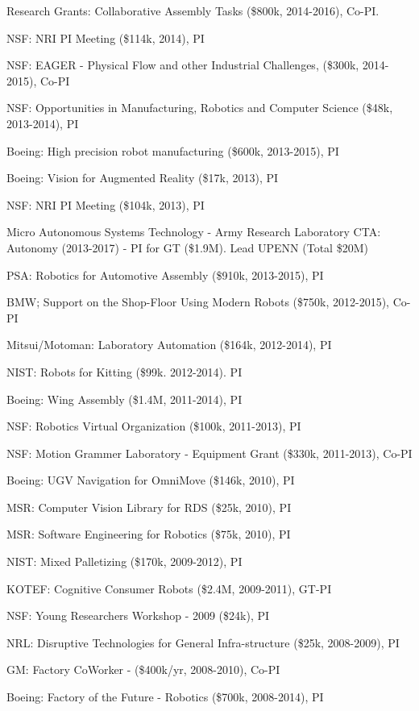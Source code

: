 \documentclass{article}
\begin{document}
\begin{cv}
\begin{cvlist}{Research Grants:}
  Collaborative Assembly Tasks (\$800k, 2014-2016), Co-PI.
\item NSF: NRI PI Meeting (\$114k, 2014), PI
\item NSF: EAGER - Physical Flow and other Industrial Challenges,
  (\$300k, 2014-2015), Co-PI
\item NSF: Opportunities in Manufacturing, Robotics and Computer Science
  (\$48k, 2013-2014), PI
\item Boeing: High precision robot manufacturing (\$600k, 2013-2015), PI
\item Boeing: Vision for Augmented Reality (\$17k, 2013), PI
\item NSF: NRI PI Meeting (\$104k, 2013), PI
\item Micro Autonomous Systems Technology - Army Research Laboratory
  CTA: Autonomy (2013-2017) - PI for GT (\$1.9M). Lead UPENN (Total
  \$20M) %
\item PSA: Robotics for Automotive Assembly (\$910k, 2013-2015), PI
\item BMW; Support on the Shop-Floor Using Modern Robots (\$750k,
  2012-2015), Co-PI
\item Mitsui/Motoman: Laboratory Automation (\$164k, 2012-2014), PI
\item NIST: Robots for Kitting (\$99k. 2012-2014). PI
\item Boeing: Wing Assembly (\$1.4M, 2011-2014), PI
\item NSF: Robotics Virtual Organization (\$100k, 2011-2013), PI
\item NSF: Motion Grammer Laboratory - Equipment Grant (\$330k, 2011-2013), Co-PI
\item Boeing: UGV Navigation for OmniMove (\$146k, 2010), PI
\item MSR: Computer Vision Library for RDS (\$25k, 2010), PI
\item MSR: Software Engineering for Robotics (\$75k, 2010), PI
\item NIST: Mixed Palletizing (\$170k, 2009-2012), PI
\item KOTEF: Cognitive Consumer Robots (\$2.4M, 2009-2011), GT-PI
\item NSF: Young Researchers Workshop - 2009 (\$24k), PI
\item NRL: Disruptive Technologies for General Infra-structure  (\$25k, 2008-2009), PI
\item GM: Factory CoWorker - (\$400k/yr, 2008-2010), Co-PI
\item Boeing: Factory of the Future - Robotics (\$700k, 2008-2014), PI

\end{cvlist}
\end{cv}
\end{document}

